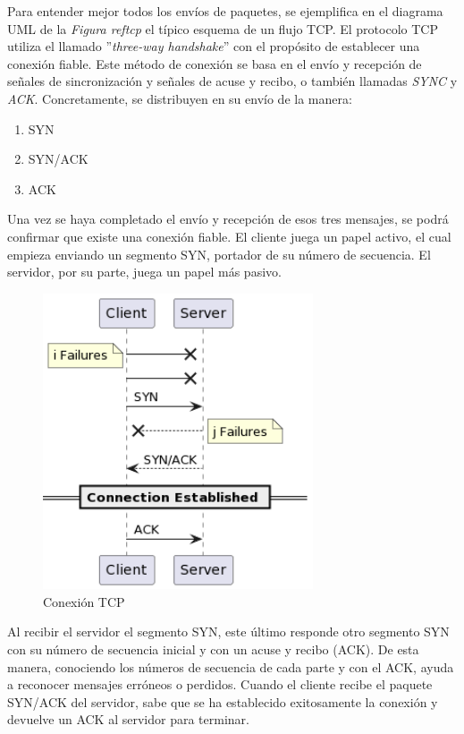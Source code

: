 \documentclass[a4paper,11pt]{book}
\begin{document}
 Para entender mejor todos los envíos de paquetes, se ejemplifica en el diagrama UML de la \textit{Figura ref{tcp}} el típico esquema de un flujo TCP. El protocolo TCP utiliza el llamado ''\textit{three-way handshake}'' con el propósito de establecer una conexión fiable. Este método de conexión se basa en el envío y recepción de señales de sincronización y señales de acuse y recibo, o también llamadas \textit{SYNC} y \textit{ACK}. Concretamente, se distribuyen en su envío de la manera:
 \begin{enumerate}
 \item SYN
 \item SYN/ACK
 \item ACK
 \end{enumerate}
Una vez se haya completado el envío y recepción de esos tres mensajes, se podrá confirmar que existe una conexión fiable. El cliente juega un papel activo, el cual empieza enviando un segmento SYN, portador de su número de secuencia. El servidor, por su parte, juega un papel más pasivo.

\begin{figure}[hbtp]
\centering
\includegraphics[width = 8cm]{FIGURAS/TCP_flow.png}
\caption{Conexión TCP}
\label{tcp}
\end{figure}


Al recibir el servidor el segmento SYN, este último responde otro segmento SYN con su número de secuencia inicial y con un acuse y recibo (ACK). De esta manera, conociendo los números de secuencia de cada parte y con el ACK, ayuda a reconocer mensajes erróneos o perdidos. Cuando el cliente recibe el paquete SYN/ACK del servidor, sabe que se ha establecido exitosamente la conexión y devuelve un ACK al servidor para terminar.
\end{document}

